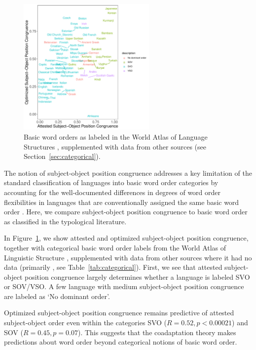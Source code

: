 \documentclass[11pt,a4paper]{article}
\begin{document}
\begin{figure}
    \centering
    \includegraphics[width=0.6\textwidth]{../analysis/categorical_order/figures/by_categorical_order.pdf}
	\caption{Basic word orders as labeled in the World Atlas of Language Structures \citep{wals-81}, supplemented with data from other sources (see Section~\ref{sec:categorical}).}
    \label{fig:categorical-basic-order}
\end{figure}



The notion of subject-object position congruence addresses a key limitation of the standard classification of languages into basic word order categories by accounting for the well-documented differences in degrees of word order flexibilities in languages that are conventionally assigned the same basic word order \citep{steele1978word}.
Here, we compare subject-object position congruence to basic word order as classified in the typological literature.


In Figure~\ref{fig:categorical-basic-order}, we show attested and optimized subject-object position congruence, together with categorical basic word order labels from the World Atlas of Linguistic Structure \citep{wals-81}, supplemented with data from other sources where it had no data (primarily \citep{gell-mann-origin-2011}, see Table~\ref{tab:categorical}).
First, we see that attested subject-object position congruence largely determines whether a language is labeled SVO or SOV/VSO.
A few language with medium subject-object position congruence are labeled as `No dominant order'.

Optimized subject-object position congruence remains predictive of attested subject-object order even within the categories SVO ($R = 0.52, p < 0.00021$) and SOV ($R=0.45, p = 0.07$).
This suggests that the coadaptation theory makes predictions about word order beyond categorical notions of basic word order.
\end{document}
